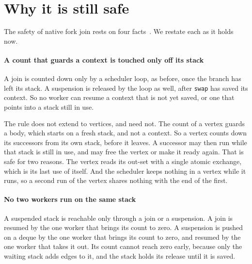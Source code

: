 \documentclass[sigplan,nonacm]{acmart}
\begin{document}
\section{Why it is still safe}
\label{sec:safety}

The safety of native fork join rests on four
facts~\cite{nativeforkjoin}.
%
We restate each as it holds now.

\paragraph{A count that guards a context is touched only off its stack}
%
A join is counted down only by a scheduler loop, as before, once the
branch has left its stack.
%
A suspension is released by the loop as well, after
\lstinline|swap| has saved its context.
%
So no worker can resume a context that is not yet saved, or one that
points into a stack still in use.

The rule does not extend to vertices, and need not.
%
The count of a vertex guards a body, which starts on a fresh stack,
and not a context.
%
So a vertex counts down its successors from its own stack, before it
leaves.
%
A successor may then run while that stack is still in use, and may
free the vertex or make it ready again.
%
That is safe for two reasons.
%
The vertex reads its out-set with a single atomic exchange, which is
its last use of itself.
%
And the scheduler keeps nothing in a vertex while it runs, so a second
run of the vertex shares nothing with the end of the first.

\paragraph{No two workers run on the same stack}
%
A suspended stack is reachable only through a join or a suspension.
%
A join is resumed by the one worker that brings its count to zero.
%
A suspension is pushed on a deque by the one worker that brings its
count to zero, and resumed by the one worker that takes it out.
%
Its count cannot reach zero early, because only the waiting stack adds
edges to it, and the stack holds its release until it is saved.
\end{document}
